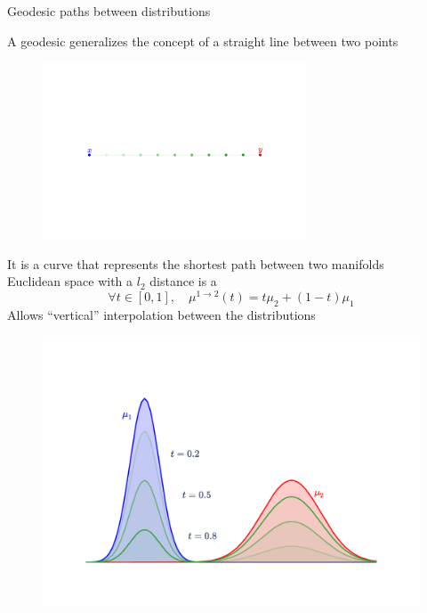 \documentclass[pdf,aspectratio=169,10pt]{beamer}
\begin{document}
\begin{frame}{Geodesic paths between distributions}
    \begin{minipage}{0.59\textwidth}
    A geodesic generalizes the concept of a straight line between two points\\
    \begin{figure}
        \centering
            \includegraphics[trim={2cm 4.5cm 2cm 5cm},clip, width=0.7\textwidth]{../img/straightLine.pdf}
        \end{figure}

    It is a curve that represents the shortest path between two manifolds\\
    Euclidean space with a $l_2$ distance is a \\
    \begin{equation*}
        \forall t \in [0,1],\quad \mu^{1\to 2}(t) = t\mu_2 + (1-t) \mu_1
    \end{equation*} 
    Allows ``vertical'' interpolation between the distributions
\end{minipage}
\hfill
\begin{minipage}{0.4\textwidth}

        \begin{figure}
            \centering
                \includegraphics[trim={2cm 2cm 2cm 2cm},clip, width=1\textwidth]{../img/geodesic_Euc_1d.pdf}
            \end{figure}
\end{minipage}

\end{frame}
\end{document}
